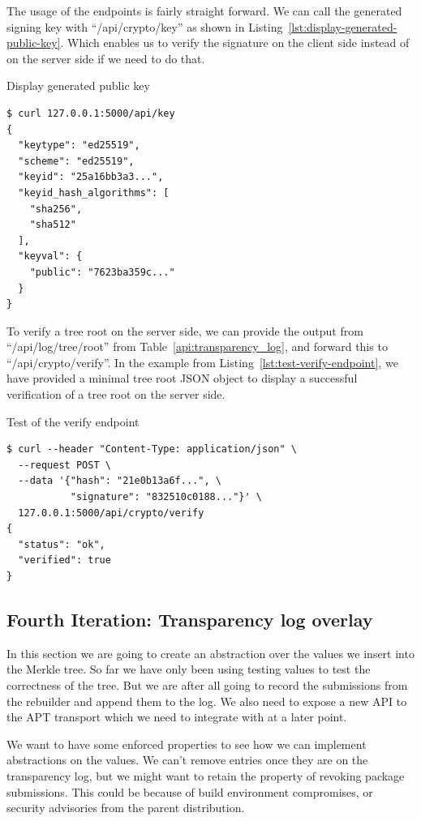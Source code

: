 \documentclass[../Main/thesis.tex]{subfiles}
\begin{document}
The usage of the endpoints is fairly straight forward. We can call the generated
signing key with ``/api/crypto/key'' as shown in
Listing~\ref{lst:display-generated-public-key}. Which enables us to verify the
signature on the client side instead of on the server side if we need to do
that.

\begin{listing}[H]
\caption{Display generated public key}
\label{lst:display-generated-public-key}
\begin{verbatim}
$ curl 127.0.0.1:5000/api/key
{
  "keytype": "ed25519",
  "scheme": "ed25519",
  "keyid": "25a16bb3a3...",
  "keyid_hash_algorithms": [
    "sha256",
    "sha512"
  ],
  "keyval": {
    "public": "7623ba359c..."
  }
}
\end{verbatim}
\end{listing}

To verify a tree root on the server side, we can provide the output from
``/api/log/tree/root'' from Table~\ref{api:transparency_log}, and forward this
to ``/api/crypto/verify''. In the example from
Listing~\ref{lst:test-verify-endpoint}, we have provided a minimal tree root
JSON object to display a successful verification of a tree root on the server
side.

\begin{listing}[H]
\caption{Test of the verify endpoint}
\label{lst:test-verify-endpoint}
\begin{verbatim}
$ curl --header "Content-Type: application/json" \
  --request POST \
  --data '{"hash": "21e0b13a6f...", \
           "signature": "832510c0188..."}' \
  127.0.0.1:5000/api/crypto/verify
{
  "status": "ok",
  "verified": true
}
\end{verbatim}
\end{listing}


\subsection{Fourth Iteration: Transparency log overlay}%
\label{sub:transparency_overlay}
In this section we are going to create an abstraction over the values we insert
into the Merkle tree. So far we have only been using testing values to test the
correctness of the tree. But we are after all going to record the submissions
from the rebuilder and append them to the log. We also need to expose a new API
to the APT transport which we need to integrate with at a later point.

We want to have some enforced properties to see how we can implement
abstractions on the values. We can't remove entries once they are on the
transparency log, but we might want to retain the property of revoking package
submissions. This could be because of build environment compromises, or security
advisories from the parent distribution.
\end{document}
